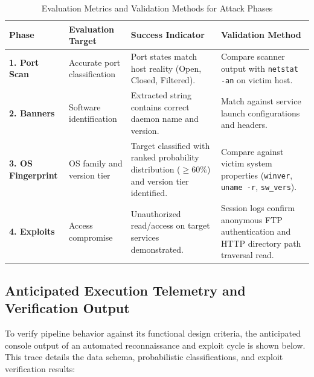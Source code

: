 \documentclass[11pt,a4paper]{article}
\begin{document}
\begin{table}[H]
\centering
\small
\renewcommand{\arraystretch}{1.2}
\caption{Evaluation Metrics and Validation Methods for Attack Phases}
\label{tab:outcomes}
\begin{tabularx}{\textwidth}{>{\raggedright\arraybackslash\bfseries}p{2.4cm} >{\raggedright\arraybackslash}p{3.2cm} >{\raggedright\arraybackslash}p{4.6cm} >{\raggedright\arraybackslash}X}
\toprule
\textbf{Phase} & \textbf{Evaluation Target} & \textbf{Success Indicator} & \textbf{Validation Method} \\
\midrule
1. Port Scan & Accurate port classification & Port states match host reality (Open, Closed, Filtered). & Compare scanner output with \texttt{netstat -an} on victim host. \\
\rowcolor{lightbg}
2. Banners & Software identification & Extracted string contains correct daemon name and version. & Match against service launch configurations and headers. \\
3. OS Fingerprint & OS family and version tier & Target classified with ranked probability distribution ($\ge 60\%$) and version tier identified. & Compare against victim system properties (\texttt{winver}, \texttt{uname -r}, \texttt{sw\_vers}). \\
\rowcolor{lightbg}
4. Exploits & Access compromise & Unauthorized read/access on target services demonstrated. & Session logs confirm anonymous FTP authentication and HTTP directory path traversal read. \\
\bottomrule
\end{tabularx}
\end{table}

\clearpage

\subsection{Anticipated Execution Telemetry and Verification Output}
To verify pipeline behavior against its functional design criteria, the anticipated console output of an automated reconnaissance and exploit cycle is shown below. This trace details the data schema, probabilistic classifications, and exploit verification results:
\end{document}
